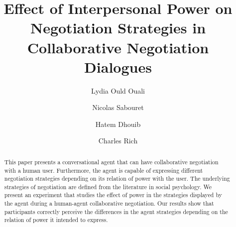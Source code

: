 \documentclass[runningheads,a4paper]{llncs}
\begin{document}
	
	\mainmatter  %
	
	\title{Effect of Interpersonal Power on Negotiation Strategies in Collaborative Negotiation Dialogues}
	
	
	
	\author{Lydia Ould Ouali%
		\and Nicolas Sabouret\and Hatem Dhouib\and Charles Rich}
	
	
	
	
	\maketitle
	
	
	\begin{abstract}
		
		This paper presents a conversational agent that can have collaborative negotiation with a human user. Furthermore, the agent is capable of expressing different negotiation strategies depending on its relation of power with the user. The underlying strategies of negotiation are defined from the literature in social psychology. We present an experiment that studies the effect of power in the strategies displayed by the agent during a human-agent collaborative negotiation. Our results show that participants correctly perceive the differences in the agent strategies depending on the relation of power it intended to express.
		
		
	\end{abstract}
	
\end{document}
